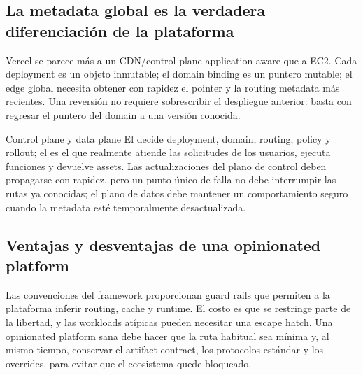 \subsection{La metadata global es la verdadera diferenciación de la plataforma}

Vercel se parece más a un CDN/control plane application-aware que a EC2. Cada deployment es un objeto inmutable; el domain binding es un puntero mutable; el edge global necesita obtener con rapidez el pointer y la routing metadata más recientes. Una reversión no requiere sobrescribir el despliegue anterior: basta con regresar el puntero del domain a una versión conocida.


\begin{importantbox}{Control plane y data plane}
El  decide deployment, domain, routing, policy y rollout; el  es el que realmente atiende las solicitudes de los usuarios, ejecuta funciones y devuelve assets. Las actualizaciones del plano de control deben propagarse con rapidez, pero un punto único de falla no debe interrumpir las rutas ya conocidas; el plano de datos debe mantener un comportamiento seguro cuando la metadata esté temporalmente desactualizada.
\end{importantbox}

\subsection{Ventajas y desventajas de una opinionated platform}

Las convenciones del framework proporcionan guard rails que permiten a la plataforma inferir routing, cache y runtime. El costo es que se restringe parte de la libertad, y las workloads atípicas pueden necesitar una escape hatch. Una opinionated platform sana debe hacer que la ruta habitual sea mínima y, al mismo tiempo, conservar el artifact contract, los protocolos estándar y los overrides, para evitar que el ecosistema quede bloqueado.


